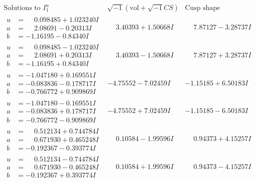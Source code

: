 \documentclass[1p]{elsarticle_modified}
\theoremstyle{definition}
\newcommand{\I}{\sqrt{-1}}
\begin{document}
$$\begin{array}{c|c|c}  
\text{Solutions to }I^u_{1}& \I (\text{vol} + \sqrt{-1}CS) & \text{Cusp shape}\\
 \hline 
\begin{aligned}
u &= \phantom{-}0.098485 + 1.023240 I \\
a &= \phantom{-}2.08691 - 0.20313 I \\
b &= -1.16195 - 0.84340 I\end{aligned}
 & \phantom{-}3.40393 + 1.50668 I & \phantom{-}7.87127 - 3.28737 I \\ \hline\begin{aligned}
u &= \phantom{-}0.098485 - 1.023240 I \\
a &= \phantom{-}2.08691 + 0.20313 I \\
b &= -1.16195 + 0.84340 I\end{aligned}
 & \phantom{-}3.40393 - 1.50668 I & \phantom{-}7.87127 + 3.28737 I \\ \hline\begin{aligned}
u &= -1.047180 + 0.169551 I \\
a &= -0.083836 - 0.178717 I \\
b &= -0.766772 + 0.909869 I\end{aligned}
 & -4.75552 - 7.02459 I & -1.15185 + 6.50183 I \\ \hline\begin{aligned}
u &= -1.047180 - 0.169551 I \\
a &= -0.083836 + 0.178717 I \\
b &= -0.766772 - 0.909869 I\end{aligned}
 & -4.75552 + 7.02459 I & -1.15185 - 6.50183 I \\ \hline\begin{aligned}
u &= \phantom{-}0.512134 + 0.744784 I \\
a &= \phantom{-}0.671930 + 0.465248 I \\
b &= -0.192367 - 0.393774 I\end{aligned}
 & \phantom{-}0.10584 - 1.99596 I & \phantom{-}0.94373 + 4.15257 I \\ \hline\begin{aligned}
u &= \phantom{-}0.512134 - 0.744784 I \\
a &= \phantom{-}0.671930 - 0.465248 I \\
b &= -0.192367 + 0.393774 I\end{aligned}
 & \phantom{-}0.10584 + 1.99596 I & \phantom{-}0.94373 - 4.15257 I \\ \hline\begin{aligned}

\end{aligned}
\end{array}$$
\end{document}
